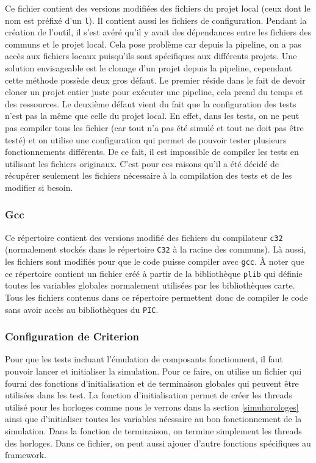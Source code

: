 \documentclass[a4paper]{article}
\begin{document}
Ce fichier contient des versions modifiées des fichiers du projet local (ceux
dont le nom est préfixé d'un \verb|l|). Il contient aussi les fichiers de
configuration. Pendant la création de l'outil, il s'est avéré qu'il y avait des
dépendances entre les fichiers des communs et le projet local. Cela pose
problème car depuis la pipeline, on a pas accès aux fichiers locaux puisqu'ils
sont spécifiques aux différents projets. Une solution envisageable est le
clonage d'un projet depuis la pipeline, cependant cette méthode possède deux
gros défaut. Le premier réside dans le fait de devoir cloner un projet entier
juste pour exécuter une pipeline, cela prend du temps et des ressources. Le
deuxième défaut vient du fait que la configuration des tests n'est pas la même
que celle du projet local. En effet, dans les tests, on ne peut pas compiler
tous les fichier (car tout n'a pas été simulé et tout ne doit pas être testé) et
on utilise une configuration qui permet de pouvoir tester plusieurs
fonctionnements différents. De ce fait, il est impossible de compiler les tests
en utilisant les fichiers originaux. C'est pour ces raisons qu'il a été décidé
de récupérer seulement les fichiers nécessaire à la compilation des tests et de
les modifier si besoin.

\subsubsection*{Gcc}
\label{gcc}

Ce répertoire contient des versions modifié des fichiers du compilateur
\verb|c32| (normalement stockés dans le répertoire \verb|C32| à la racine des
communs). Là aussi, les fichiers sont modifiés pour que le code puisse compiler
avec \verb|gcc|. À noter que ce répertoire contient un fichier créé à partir de
la bibliothèque \verb|plib| qui définie toutes les variables globales
normalement utilisées par les bibliothèques carte. Tous les fichiers contenus
dans ce répertoire permettent donc de compiler le code sans avoir accès au
bibliothèques du \verb|PIC|.

\subsubsection*{Configuration de Criterion}
\label{configuration-de-criterion}

Pour que les tests incluant l'émulation de composants fonctionnent, il faut
pouvoir lancer et initialiser la simulation. Pour ce faire, on utilise un
fichier qui fourni des fonctions d'initialisation et de terminaison globales qui
peuvent être utilisées dans les test. La fonction d'initialisation permet de
créer les threads utilisé pour les horloges comme nous le verrons dans la
section \ref{simuhorologes} ainsi que d'initialiser toutes les variables
nécssaire au bon fonctionnement de la simulation. Dans la fonction de
terminaison, on termine simplement les threads des horloges. Dans ce fichier, on
peut aussi ajouer d'autre fonctions spécifiques au framework.
\end{document}
